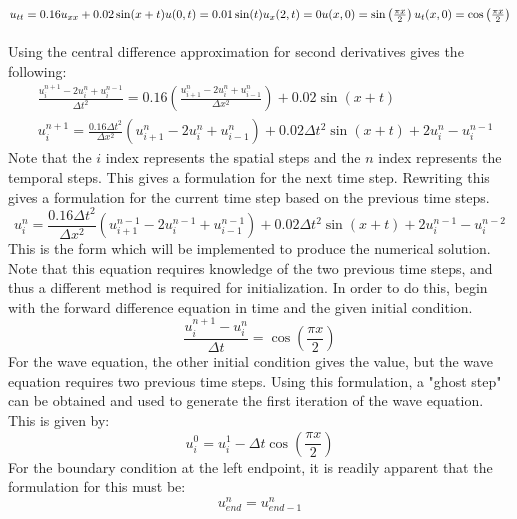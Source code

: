 \documentclass{article}
\begin{document}
\subsection*{$u_{tt} = 0.16u_{xx} + 0.02\sin(x+t)\\u(0,t) = 0.01\sin(t)\\u_x(2,t) = 0\\u(x,0) = \sin\left(\frac{\pi x}{2}\right)\\u_t(x,0) = \cos\left(\frac{\pi x}{2}\right)$}
Using the central difference approximation for second derivatives gives the following:
\begin{equation}
    \begin{aligned}
        &\frac{u_i^{n+1} - 2u_i^n + u_i^{n-1}}{\Delta t^2} = 0.16\left(\frac{u_{i+1}^n - 2u_i^n + u_{i-1}^n}{\Delta x^2}\right) + 0.02\sin\left(x+t\right)\\
        &u_i^{n+1} = \frac{0.16\Delta t^2}{\Delta x^2}\left(u_{i+1}^n - 2u_i^n + u_{i-1}^n\right) + 0.02\Delta t^2\sin\left(x+t\right) + 2u_i^n - u_i^{n-1}
    \end{aligned}
\end{equation}
Note that the $i$ index represents the spatial steps and the $n$ index represents the temporal steps. This gives a formulation for the next time step. Rewriting this gives a formulation for the current time step based on the previous time steps.
\begin{equation}
    u_i^{n} = \frac{0.16\Delta t^2}{\Delta x^2}\left(u_{i+1}^{n-1} - 2u_i^{n-1} + u_{i-1}^{n-1}\right) + 0.02\Delta t^2\sin\left(x+t\right) + 2u_i^{n-1} - u_i^{n-2}
\end{equation}
This is the form which will be implemented to produce the numerical solution. Note that this equation requires knowledge of the two previous time steps, and thus a different method is required for initialization. In order to do this, begin with the forward difference equation in time and the given initial condition.
\begin{equation}
    \frac{u_i^{n+1} - u_i^n}{\Delta t} = \cos\left(\frac{\pi x}{2}\right)
\end{equation}
For the wave equation, the other initial condition gives the value, but the wave equation requires two previous time steps. Using this formulation, a "ghost step" can be obtained and used to generate the first iteration of the wave equation. This is given by:
\begin{equation}
    u_i^0 = u_i^1 - \Delta t\cos\left(\frac{\pi x}{2}\right)
\end{equation}
For the boundary condition at the left endpoint, it is readily apparent that the formulation for this must be:
\begin{equation}
    u_{end}^n = u_{end-1}^n
\end{equation}
\end{document}
